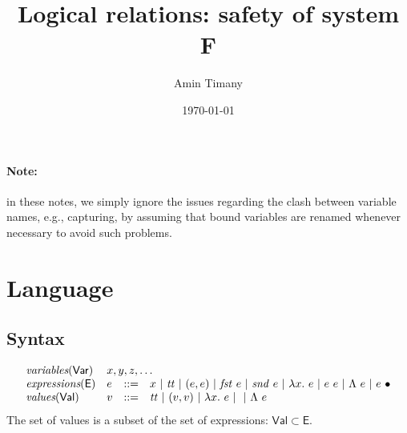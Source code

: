 \documentclass{article}
\title{Logical relations: safety of system F}
\author{Amin Timany}
\date{\today}
\newcommand{\gor}{~|~}
\newcommand{\fst}{\mathit{fst}}
\newcommand{\snd}{\mathit{snd}}
\newcommand{\TT}{\mathit{tt}}
\newcommand{\VAR}{\mathsf{Var}}
\newcommand{\EXP}{\mathsf{E}}
\newcommand{\VAL}{\mathsf{Val}}
\begin{document}
\maketitle

\paragraph{Note:} in these notes, we simply ignore the issues
regarding the clash between variable names, e.g., capturing, by
assuming that bound variables are renamed whenever necessary
to avoid such problems.

\section{Language}
\subsection{Syntax}
\[
\begin{array}{llll}
\textit{variables}(\VAR) & \multicolumn{3}{l}{x, y, z, \dots}\\
\textit{expressions}(\EXP) & e &::=& x \gor \TT \gor (e, e)
\gor \fst~e \gor \snd~e \gor \lambda x.~e \gor e~e
\gor \Lambda~e \gor e~\bullet\\
\textit{values}(\VAL) & v &::=& \TT \gor (v, v) \gor \lambda x.~e
\gor \gor \Lambda~e
\end{array}
\]
The set of values is a subset of the set of expressions: $\VAL \subset \EXP$.
\end{document}
